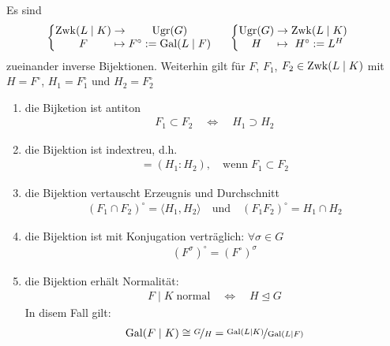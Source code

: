 \begin{theorem}[Galoiskorrespondenz]
	Es sind \begin{align*}
		&\left\lbrace\begin{array}{@{}c@{\;}c@{\;}c}
			\zwk(L\mid K) & \rightarrow & \ugr(G) \\
			F & \mapsto & F^\circ := \Gal(L\mid F)
		\end{array}\right.&
		&\left\lbrace \begin{array}{@{}c@{\;}c@{\;}c}
			\ugr(G) & \rightarrow & \zwk(L\mid K) \\
			H & \mapsto & H^\circ := L^H
		\end{array}\right.
	\end{align*}
	zueinander inverse Bijektionen. Weiterhin gilt für $F$, $F_1$, $F_2\in\operatorname{Zwk}(L\mid K)$ mit $H = F^\circ$, $H_1 = F_1^\circ$ und $H_2 = F_2^\circ$ \begin{enumerate}[label={\roman*)}]
		\item \label{2_2_2_1} die Bijketion ist antiton \begin{align*}
			F_1\subset F_2 \quad\Leftrightarrow\quad H_1\supset H_2
		\end{align*}
		\item die Bijektion ist indextreu, d.h.\begin{align*}
			[F_2:F_1] = (H_1:H_2),\quad\text{wenn}\;F_1\subset F_2
		\end{align*}
		\item die Bijektion vertauscht Erzeugnis und Durchschnitt \begin{align*}
			(F_1\cap F_2)^\circ = \langle H_1,H_2\rangle\quad\text{und}\quad(F_1F_2)^\circ = H_1\cap H_2
		\end{align*}
		\item \label{2_2_2_4} die Bijektion ist mit Konjugation verträglich: $\forall \sigma\in G$ \begin{align*}
			\left( F^\sigma\right)^\circ = \left( F^\circ\right)^\sigma
		\end{align*}
		\item die Bijektion erhält Normalität: \begin{align*}
			F\mid K\;\text{normal}\quad\Leftrightarrow\quad H\unlhd G
		\end{align*}
		In disem Fall gilt: \begin{align*}
			\Gal(F\mid K) \cong \lnkset{G}{H} = \lnkset{\Gal(L\mid K)}{\Gal(L\mid F)}
		\end{align*}
	\end{enumerate}
\end{theorem}

